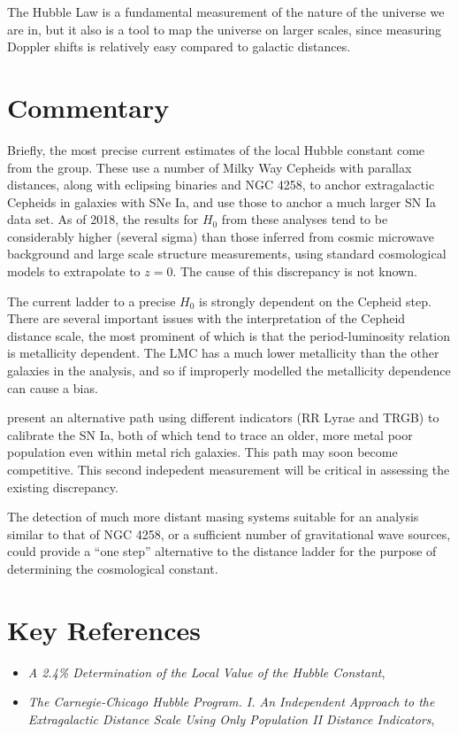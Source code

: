 The Hubble Law is a fundamental measurement of the nature of the
universe we are in, but it also is a tool to map the universe on
larger scales, since measuring Doppler shifts is relatively easy
compared to galactic distances.

\section{Commentary}

Briefly, the most precise current estimates of the local Hubble
constant come from the \citet{riess16a} group. These use a number of
Milky Way Cepheids with parallax distances, along with eclipsing
binaries and NGC 4258, to anchor extragalactic Cepheids in galaxies
with SNe Ia, and use those to anchor a much larger SN Ia data set. As
of 2018, the results for $H_0$ from these analyses tend to be
considerably higher (several sigma) than those inferred from cosmic
microwave background and large scale structure measurements, using
standard cosmological models to extrapolate to $z=0$. The cause of
this discrepancy is not known.

The current ladder to a precise $H_0$ is strongly dependent on the
Cepheid step. There are several important issues with the
interpretation of the Cepheid distance scale, the most prominent of
which is that the period-luminosity relation is metallicity
dependent. The LMC has a much lower metallicity than the other
galaxies in the analysis, and so if improperly modelled the
metallicity dependence can cause a bias.

\citet{beaton16a} present an alternative path using different
indicators (RR Lyrae and TRGB) to calibrate the SN Ia, both of which
tend to trace an older, more metal poor population even within metal
rich galaxies. This path may soon become competitive. This second
indepedent measurement will be critical in assessing the existing
discrepancy.

The detection of much more distant masing systems suitable for an
analysis similar to that of NGC 4258, or a sufficient number of
gravitational wave sources, could provide a ``one step'' alternative
to the distance ladder for the purpose of determining the cosmological
constant.

\section{Key References}

\begin{itemize}
  \item
    {\it A 2.4\% Determination of the Local Value of the Hubble
    Constant}, \citet{riess16a}
  \item
    {\it The Carnegie-Chicago Hubble Program. I. An Independent
    Approach to the Extragalactic Distance Scale Using Only Population
    II Distance Indicators}, \citet{beaton16a} 
\end{itemize}

